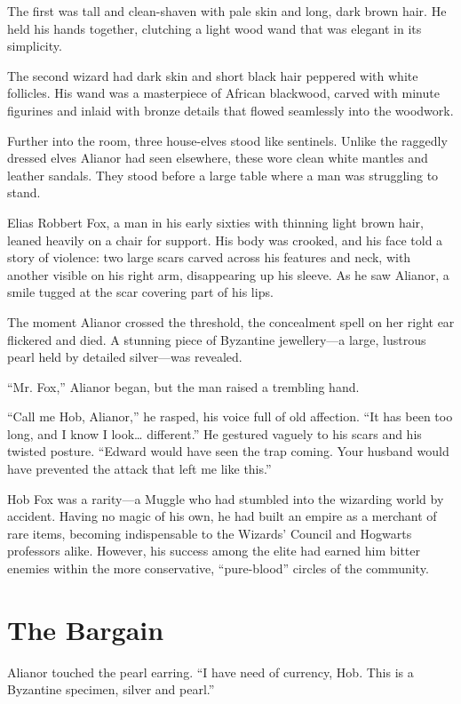 The first was tall and clean-shaven with pale skin and long, dark brown hair. He held his hands together, clutching a light wood wand that was elegant in its simplicity.

The second wizard had dark skin and short black hair peppered with white follicles. His wand was a masterpiece of African blackwood, carved with minute figurines and inlaid with bronze details that flowed seamlessly into the woodwork.

Further into the room, three house-elves stood like sentinels. Unlike the raggedly dressed elves Alianor had seen elsewhere, these wore clean white mantles and leather sandals. They stood before a large table where a man was struggling to stand.

Elias Robbert Fox, a man in his early sixties with thinning light brown hair, leaned heavily on a chair for support. His body was crooked, and his face told a story of violence: two large scars carved across his features and neck, with another visible on his right arm, disappearing up his sleeve. As he saw Alianor, a smile tugged at the scar covering part of his lips.

The moment Alianor crossed the threshold, the concealment spell on her right ear flickered and died. A stunning piece of Byzantine jewellery---a large, lustrous pearl held by detailed silver---was revealed.

\enquote{Mr. Fox,} Alianor began, but the man raised a trembling hand.

\enquote{Call me Hob, Alianor,} he rasped, his voice full of old affection. \enquote{It has been too long, and I know I look\ldots{} different.} He gestured vaguely to his scars and his twisted posture. \enquote{Edward would have seen the trap coming. Your husband would have prevented the attack that left me like this.}

Hob Fox was a rarity---a Muggle who had stumbled into the wizarding world by accident. Having no magic of his own, he had built an empire as a merchant of rare items, becoming indispensable to the Wizards' Council and Hogwarts professors alike. However, his success among the elite had earned him bitter enemies within the more conservative, \enquote{pure-blood} circles of the community.

\section*{The Bargain}

Alianor touched the pearl earring. \enquote{I have need of currency, Hob. This is a Byzantine specimen, silver and pearl.}

